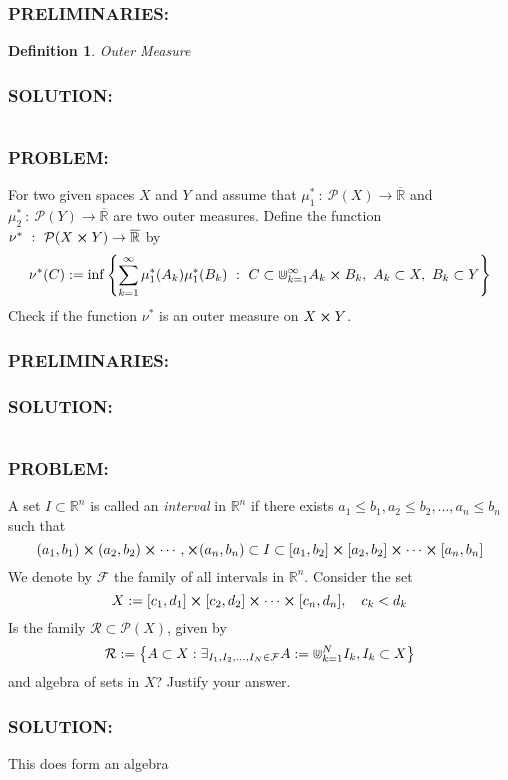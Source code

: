 \documentclass[]{article}
\newcommand{\Problem}{\subsubsection*{\textbf{PROBLEM:}}}
\newcommand{\Solution}{\subsubsection*{\textbf{SOLUTION:}}}
\newcommand{\Preliminaries}{\subsubsection*{\textbf{PRELIMINARIES:}}}
\newcommand{\R}{\mathbb{R}}
\newcommand{\st}{\ : \ }
\newtheorem{definition}{Definition}
\begin{document}
\Preliminaries
\begin{definition}
    Outer Measure
\end{definition}



\Solution




\newpage
\section{}
\Problem
For two given spaces $X$ and $Y$ and assume that $\mu_1^* \st \mathcal{P}(X) \to \overline{\R}$ and $\mu_2^* \st \mathcal{P}(Y) \to \overline{\R}$ are two outer measures.
Define the function $\nu^* \st \mathcal{P}(X \cross Y) \to \overline{\R}$ by \[
    \nu^*(C) := \inf \qty{
        \sum_{k=1}^{\infty} \mu_1^*(A_k) \mu_1^*(B_k) \st C \subset \Cup_{k=1}^{\infty} A_k \cross B_k, 
        \ A_k \subset X, 
        \ B_k \subset Y
    }
\]
Check if the function $\nu^*$ is an outer measure on $X \cross Y$.

\Preliminaries


\Solution




\newpage
\section{}
\Problem
A set $I \subset \R^n$ is called an \emph{interval} in $\R^n$ if there exists $a_1 \leq b_1, a_2 \leq b_2, \dots, a_n \leq b_n$ such that \[
    (a_1,b_1) \cross (a_2,b_2) \cross \cdots, \cross (a_n,b_n) \subset I \subset [a_1,b_2] \cross [a_2,b_2] \cross \cdots \cross [a_n,b_n]
\]
We denote by $\mathcal{F}$ the family of all intervals in $\R^n$.
Consider the set \[
    X := [c_1,d_1] \cross [c_2,d_2] \cross \cdots \cross [c_n,d_n], \quad c_k < d_k
\]
Is the family $\mathcal{R} \subset \mathcal{P}(X)$, given by \[
    \mathcal{R} := \qty{
        A \subset X : 
        \exists_{I_1,I_2,\dots,I_N \in \mathcal{F}} A := \Cup_{k=1}^{N} I_k, 
        I_k \subset X
    }
\] and algebra of sets in $X$? 
Justify your answer.


\Solution
This does form an algebra 
\end{document}
